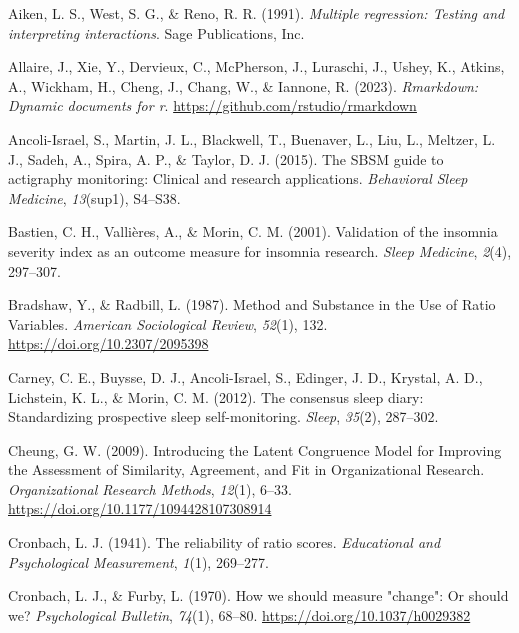 \documentclass[
]{article}
\newlength{\cslhangindent}
\newenvironment{CSLReferences}[2] %
 {\begin{list}{}{%
  \setlength{\itemindent}{0pt}
  \setlength{\leftmargin}{0pt}
  \setlength{\parsep}{0pt}
  \ifodd #1
   \setlength{\leftmargin}{\cslhangindent}
   \setlength{\itemindent}{-1\cslhangindent}
  \fi
  \setlength{\itemsep}{#2\baselineskip}}}
 {\end{list}}
\begin{document}
\label{refs}
\begin{CSLReferences}{1}{0}
Aiken, L. S., West, S. G., \& Reno, R. R. (1991). \emph{Multiple regression: Testing and interpreting interactions}. Sage Publications, Inc.

Allaire, J., Xie, Y., Dervieux, C., McPherson, J., Luraschi, J., Ushey, K., Atkins, A., Wickham, H., Cheng, J., Chang, W., \& Iannone, R. (2023). \emph{Rmarkdown: Dynamic documents for r}. \url{https://github.com/rstudio/rmarkdown}

Ancoli-Israel, S., Martin, J. L., Blackwell, T., Buenaver, L., Liu, L., Meltzer, L. J., Sadeh, A., Spira, A. P., \& Taylor, D. J. (2015). The SBSM guide to actigraphy monitoring: Clinical and research applications. \emph{Behavioral Sleep Medicine}, \emph{13}(sup1), S4--S38.

Bastien, C. H., Vallières, A., \& Morin, C. M. (2001). Validation of the insomnia severity index as an outcome measure for insomnia research. \emph{Sleep Medicine}, \emph{2}(4), 297--307.

Bradshaw, Y., \& Radbill, L. (1987). {Method and Substance in the Use of Ratio Variables}. \emph{American Sociological Review}, \emph{52}(1), 132. \url{https://doi.org/10.2307/2095398}

Carney, C. E., Buysse, D. J., Ancoli-Israel, S., Edinger, J. D., Krystal, A. D., Lichstein, K. L., \& Morin, C. M. (2012). The consensus sleep diary: Standardizing prospective sleep self-monitoring. \emph{Sleep}, \emph{35}(2), 287--302.

Cheung, G. W. (2009). Introducing the {Latent} {Congruence} {Model} for {Improving} the {Assessment} of {Similarity}, {Agreement}, and {Fit} in {Organizational} {Research}. \emph{Organizational Research Methods}, \emph{12}(1), 6--33. \url{https://doi.org/10.1177/1094428107308914}

Cronbach, L. J. (1941). The reliability of ratio scores. \emph{Educational and Psychological Measurement}, \emph{1}(1), 269--277.

Cronbach, L. J., \& Furby, L. (1970). {How we should measure "change": Or should we?} \emph{Psychological Bulletin}, \emph{74}(1), 68--80. \url{https://doi.org/10.1037/h0029382}


\end{CSLReferences}
\end{document}
